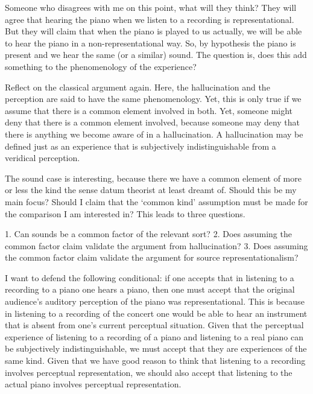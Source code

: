 \documentclass[sloppy, journal, git, bytitle, dodraft]{humapap}
\begin{document}
Someone who disagrees with me on this point, what will they think? They will agree that hearing the piano when we listen to a recording is representational. But they will claim that when the piano is played to us actually, we will be able to hear the piano in a non-representational way. So, by hypothesis the piano is present and we hear the same (or a similar) sound. The question is, does this add something to the phenomenology of the experience? 

Reflect on the classical argument again. Here, the hallucination and the perception are said to have the same phenomenology. Yet, this is only true if we assume that there is a common element involved in both. Yet, someone might deny that there is a common element involved, because someone may deny that there is anything we become aware of in a hallucination. A hallucination may be defined just as an experience that is subjectively indistinguishable from a veridical perception. 

The sound case is interesting, because there we have a common element of more or less the kind the sense datum theorist at least dreamt of. Should this be my main focus? Should I claim that the `common kind' assumption must be made for the comparison I am interested in? This leads to three questions. 

1. Can sounds be a common factor of the relevant sort?
2. Does assuming the common factor claim validate the argument from hallucination? 
3. Does assuming the common factor claim validate the argument for source representationalism? 


\sect



I want to defend the following conditional: if one accepts that in listening to a recording to a piano one hears a piano, then one must accept that the original audience’s auditory perception of the piano was representational. This is because in listening to a recording of the concert one would be able to hear an instrument that is absent from one’s current perceptual situation. Given that the perceptual experience of listening to a recording of a piano and listening to a real piano can be subjectively indistinguishable, we must accept that they are experiences of the same kind. Given that we have good reason to think that listening to a recording involves perceptual representation, we should also accept that listening to the actual piano involves perceptual representation. 
\end{document}
